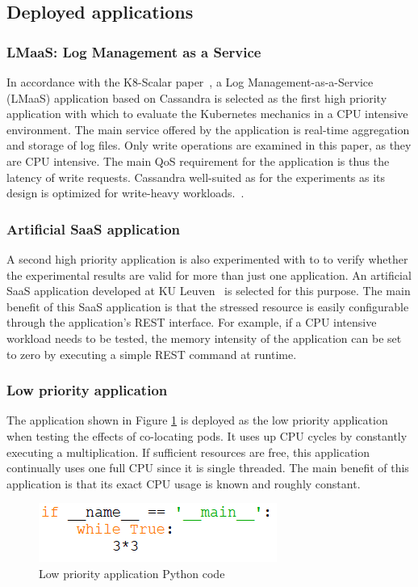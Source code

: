\newpage

\subsection{Deployed applications}
\label{test-apps}

\subsubsection{LMaaS: Log Management as a Service}
In accordance with the K8-Scalar paper~\citep{scalar}, a Log Management-as-a-Service (LMaaS) application based on Cassandra is selected as the first high priority application with which to evaluate the Kubernetes mechanics in a CPU intensive environment. The main service offered by the application is real-time aggregation and storage of log files. Only write operations are examined in this paper, as they are CPU intensive. The main QoS requirement for the application is thus the latency of write requests. Cassandra well-suited as for the experiments as its design is optimized for write-heavy workloads.~\citep{scalar}.

\subsubsection{Artificial SaaS application}
\label{setup:saas-app}
A second high priority application is also experimented with to to verify whether the experimental results are valid for more than just one application. An artificial SaaS application developed at KU Leuven~\citep{saas-app} is selected for this purpose. The main benefit of this SaaS application is that the stressed resource is easily configurable through the application's REST interface. For example, if a CPU intensive workload needs to be tested, the memory intensity of the application can be set to zero by executing a simple REST command at runtime. 

\subsubsection{Low priority application}
\label{setup:lpp}
The application shown in Figure \ref{fig:cpu-app-python} is deployed as the low priority application when testing the effects of co-locating pods. It uses up CPU cycles by constantly executing a multiplication. If sufficient resources are free, this application continually uses one full CPU since it is single threaded. The main benefit of this application is that its exact CPU usage is known and roughly constant.
\newpage

\bigskip
\begin{figure}[htbp]
\centering
\includegraphics[width=0.45\columnwidth]{Images/Experiments/Cpu-app.PNG}
\caption{Low priority application Python code}
\label{fig:cpu-app-python}
\end{figure}
\null
\vfill
